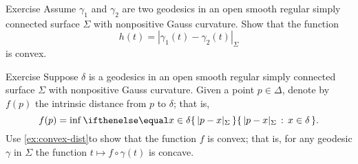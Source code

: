 \begin{thm}{Exercise}\label{ex:convex-dist}
Assume $\gamma_1$ and $\gamma_2$ are two geodesics in an open smooth regular simply connected surface $\Sigma$ with nonpositive Gauss curvature.
Show that the function
\[h(t)=|\gamma_1(t)-\gamma_2(t)|_\Sigma\]
is convex.
\end{thm}

\begin{thm}{Exercise}\label{ex:convex-dist+}
Suppose $\delta$ is a geodesics in an open smooth regular simply connected surface $\Sigma$ with nonpositive Gauss curvature.
Given a point $p\in\Delta$, denote by $f(p)$ the intrinsic distance from $p$ to $\delta$;
that is,
\[f(p)=\inf\set{|p-x|_\Sigma}{x\in\delta}.\]
Use \ref{ex:convex-dist}to show that the function $f$ is convex;
that is, for any geodesic $\gamma$ in $\Sigma$ the function $t\mapsto f\circ\gamma(t)$ is concave.
\end{thm}



